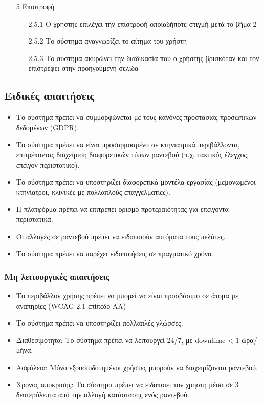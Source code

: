 \documentclass[12pt,a4paper,twoside]{book}
\begin{document}
\begin{enumerate}
\begin{enumerate}
        \end{enumerate}
  \item[5 ] Επιστροφή
        \begin{enumerate}
          \item[2.5.1 ] Ο χρήστης επιλέγει την επιστροφή οποιαδήποτε στιγμή μετά το βήμα 2 %
          \item[2.5.2 ] Το σύστημα αναγνωρίζει το αίτημα του χρήστη %
          \item[2.5.3 ] Το σύστημα ακυρώνει την διαδικασία που ο χρήστης βρισκόταν και τον επιστρέφει στην προηγούμενη σελίδα %
        \end{enumerate}
\end{enumerate}

\subsection{Ειδικές απαιτήσεις} %
\begin{itemize}
  \item Το σύστημα πρέπει να συμμορφώνεται με τους κανόνες προστασίας προσωπικών δεδομένων (GDPR). %
  \item Το σύστημα πρέπει να είναι προσαρμοσμένο σε κτηνιατρικά περιβάλλοντα, επιτρέποντας διαχείριση διαφορετικών τύπων ραντεβού (π.χ. τακτικός έλεγχος, επείγον περιστατικό). %
  \item Το σύστημα πρέπει να υποστηρίζει διαφορετικά μοντέλα εργασίας (μεμονωμένοι κτηνίατροι, κλινικές με πολλαπλούς επαγγελματίες). %
  \item Η πλατφόρμα πρέπει να επιτρέπει ορισμό προτεραιότητας για επείγοντα περιστατικά.
  \item Οι αλλαγές σε ραντεβού πρέπει να ειδοποιούν αυτόματα τους πελάτες. %
  \item Το σύστημα πρέπει να παρέχει ειδοποιήσεις σε πραγματικό χρόνο. %
\end{itemize}

\subsubsection{Μη λειτουργικές απαιτήσεις}
\begin{itemize}
  \item Το περιβάλλον χρήσης πρέπει να μπορεί να  είναι προσβάσιμο σε  άτομα με αναπηρίες (WCAG 2.1 επίπεδο AA) %
  \item Το σύστημα πρέπει να υποστηρίζει πολλαπλές γλώσσες.
  \item Διαθεσιμότητα: Το σύστημα πρέπει να λειτουργεί 24/7, με downtime < 1 ώρα/μήνα.
  \item Ασφάλεια: Μόνο εξουσιοδοτημένοι χρήστες μπορούν να διαχειρίζονται ραντεβού. %
  \item Χρόνος απόκρισης: Το σύστημα πρέπει να ειδοποιεί τον χρήστη μέσα σε 3 δευτερόλεπτα από την αλλαγή κατάστασης ενός ραντεβού. %
\end{itemize}
\end{document}
